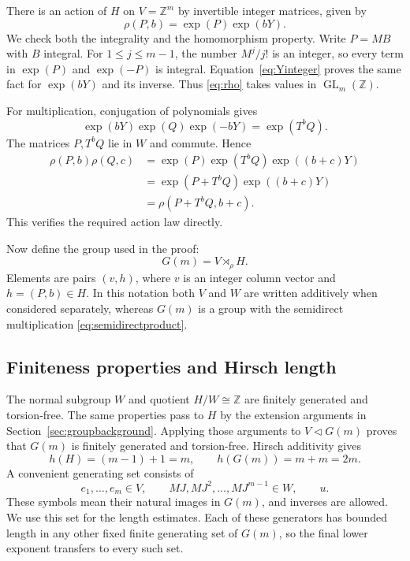 \documentclass[11pt]{article}
\numberwithin{equation}{section}
\theoremstyle{definition}
\theoremstyle{remark}
\newcommand{\Z}{\mathbb Z}
\newcommand{\GL}{\operatorname{GL}}
\begin{document}
There is an action of $H$ on $V=\Z^m$ by invertible integer matrices, given by
\begin{equation}\label{eq:rho}
\rho(P,b)=\exp(P)\exp(bY).
\end{equation}
We check both the integrality and the homomorphism property. Write $P=MB$ with $B$ integral. For $1\le j\le m-1$, the number $M^j/j!$ is an integer, so every term in $\exp(P)$ and $\exp(-P)$ is integral. Equation~\eqref{eq:Yinteger} proves the same fact for $\exp(bY)$ and its inverse. Thus \eqref{eq:rho} takes values in $\GL_m(\Z)$.

For multiplication, conjugation of polynomials gives
\[
\exp(bY)\exp(Q)\exp(-bY)=\exp(T^bQ).
\]
The matrices $P,T^bQ$ lie in $W$ and commute. Hence
\begin{align*}
\rho(P,b)\rho(Q,c)
&=\exp(P)\exp(T^bQ)\exp((b+c)Y)\\
&=\exp(P+T^bQ)\exp((b+c)Y)\\
&=\rho(P+T^bQ,b+c).
\end{align*}
This verifies the required action law directly.

Now define the group used in the proof:
\begin{equation}\label{eq:Gm}
G(m)=V\rtimes_\rho H.
\end{equation}
Elements are pairs $(v,h)$, where $v$ is an integer column vector and $h=(P,b)\in H$. In this notation both $V$ and $W$ are written additively when considered separately, whereas $G(m)$ is a group with the semidirect multiplication \eqref{eq:semidirectproduct}.

\subsection{Finiteness properties and Hirsch length}
The normal subgroup $W$ and quotient $H/W\cong\Z$ are finitely generated and torsion-free. The same properties pass to $H$ by the extension arguments in Section~\ref{sec:groupbackground}. Applying those arguments to $V\triangleleft G(m)$ proves that $G(m)$ is finitely generated and torsion-free. Hirsch additivity gives
\begin{equation}\label{eq:Hirsch}
h(H)=(m-1)+1=m,\qquad h(G(m))=m+m=2m.
\end{equation}
A convenient generating set consists of
\[
e_1,\ldots,e_m\in V,\qquad MJ,MJ^2,\ldots,MJ^{m-1}\in W,\qquad u.
\]
These symbols mean their natural images in $G(m)$, and inverses are allowed. We use this set for the length estimates. Each of these generators has bounded length in any other fixed finite generating set of $G(m)$, so the final lower exponent transfers to every such set.
\end{document}
